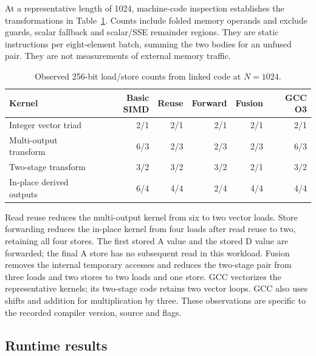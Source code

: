At a representative length of 1024, machine-code inspection establishes the transformations in Table~\ref{tab:app-counts}. Counts include folded memory operands and exclude guards, scalar fallback and scalar/SSE remainder regions. They are static instructions per eight-element batch, summing the two bodies for an unfused pair. They are not measurements of external memory traffic.

\begin{table}[htbp]\centering\small

\caption{Observed 256-bit load/store counts from linked code at $N=1024$.}

\label{tab:app-counts}

\begin{tabular}{lrrrrr}\toprule

Kernel & Basic SIMD & Reuse & Forward & Fusion & GCC O3 \\

\midrule

Integer vector triad & 2/1 & 2/1 & 2/1 & 2/1 & 2/1 \\

Multi-output transform & 6/3 & 2/3 & 2/3 & 2/3 & 6/3 \\

Two-stage transform & 3/2 & 3/2 & 3/2 & 2/1 & 3/2 \\

In-place derived outputs & 6/4 & 4/4 & 2/4 & 4/4 & 4/4 \\

\bottomrule\end{tabular}\end{table}

Read reuse reduces the multi-output kernel from six to two vector loads. Store forwarding reduces the in-place kernel from four loads after read reuse to two, retaining all four stores. The first stored A value and the stored D value are forwarded; the final A store has no subsequent read in this workload. Fusion removes the internal temporary accesses and reduces the two-stage pair from three loads and two stores to two loads and one store. GCC vectorizes the representative kernels; its two-stage code retains two vector loops. GCC also uses shifts and addition for multiplication by three. These observations are specific to the recorded compiler version, source and flags.

\subsection{Runtime results}

